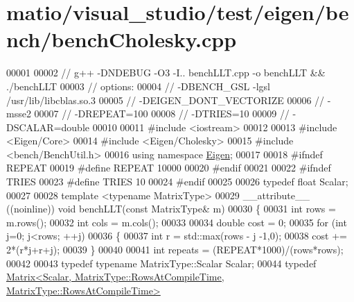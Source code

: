 \hypertarget{matio_2visual__studio_2test_2eigen_2bench_2bench_cholesky_8cpp_source}{}\section{matio/visual\+\_\+studio/test/eigen/bench/bench\+Cholesky.cpp}
\label{matio_2visual__studio_2test_2eigen_2bench_2bench_cholesky_8cpp_source}

\begin{DoxyCode}
00001 
00002 \textcolor{comment}{// g++ -DNDEBUG -O3 -I.. benchLLT.cpp  -o benchLLT && ./benchLLT}
00003 \textcolor{comment}{// options:}
00004 \textcolor{comment}{//  -DBENCH\_GSL -lgsl /usr/lib/libcblas.so.3}
00005 \textcolor{comment}{//  -DEIGEN\_DONT\_VECTORIZE}
00006 \textcolor{comment}{//  -msse2}
00007 \textcolor{comment}{//  -DREPEAT=100}
00008 \textcolor{comment}{//  -DTRIES=10}
00009 \textcolor{comment}{//  -DSCALAR=double}
00010 
00011 \textcolor{preprocessor}{#include <iostream>}
00012 
00013 \textcolor{preprocessor}{#include <Eigen/Core>}
00014 \textcolor{preprocessor}{#include <Eigen/Cholesky>}
00015 \textcolor{preprocessor}{#include <bench/BenchUtil.h>}
00016 \textcolor{keyword}{using namespace }\hyperlink{namespace_eigen}{Eigen};
00017 
00018 \textcolor{preprocessor}{#ifndef REPEAT}
00019 \textcolor{preprocessor}{#define REPEAT 10000}
00020 \textcolor{preprocessor}{#endif}
00021 
00022 \textcolor{preprocessor}{#ifndef TRIES}
00023 \textcolor{preprocessor}{#define TRIES 10}
00024 \textcolor{preprocessor}{#endif}
00025 
00026 \textcolor{keyword}{typedef} \textcolor{keywordtype}{float} Scalar;
00027 
00028 \textcolor{keyword}{template} <\textcolor{keyword}{typename} MatrixType>
00029 \_\_attribute\_\_ ((noinline)) \textcolor{keywordtype}{void} benchLLT(\textcolor{keyword}{const} MatrixType& m)
00030 \{
00031   \textcolor{keywordtype}{int} rows = m.rows();
00032   \textcolor{keywordtype}{int} cols = m.cols();
00033 
00034   \textcolor{keywordtype}{double} cost = 0;
00035   \textcolor{keywordflow}{for} (\textcolor{keywordtype}{int} j=0; j<rows; ++j)
00036   \{
00037     \textcolor{keywordtype}{int} r = std::max(rows - j -1,0);
00038     cost += 2*(r*j+r+j);
00039   \}
00040 
00041   \textcolor{keywordtype}{int} repeats = (REPEAT*1000)/(rows*rows);
00042 
00043   \textcolor{keyword}{typedef} \textcolor{keyword}{typename} MatrixType::Scalar Scalar;
00044   \textcolor{keyword}{typedef} 
      \hyperlink{group___core___module_class_eigen_1_1_matrix}{Matrix<Scalar, MatrixType::RowsAtCompileTime, MatrixType::RowsAtCompileTime>}

\end{DoxyCode}
